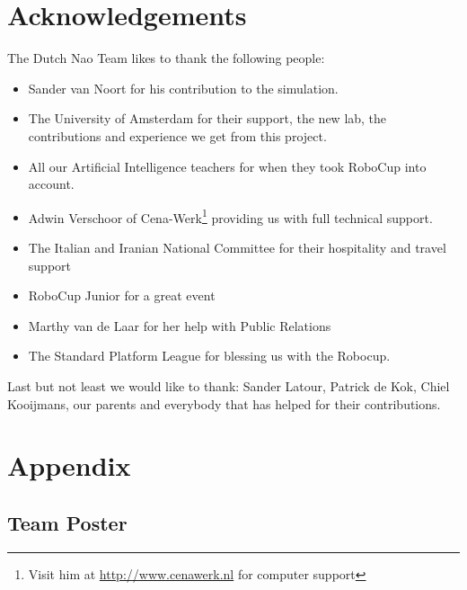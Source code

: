 \documentclass[11pt,a4paper,oneside]{article}
\begin{document}
\section{Acknowledgements}
The Dutch Nao Team likes to thank the following people:
\begin{itemize}
\item Sander van Noort for his contribution to the simulation. 
\item The University of Amsterdam for their support, the new lab, the contributions and experience we get from this project. 
\item All our Artificial Intelligence teachers for when they took RoboCup into account.
\item Adwin Verschoor of Cena-Werk\footnote{Visit him at \url{http://www.cenawerk.nl} for computer support} providing us with full technical support. 
\item The Italian and Iranian National Committee for their hospitality and travel support
\item RoboCup Junior for a great event
\item Marthy van de Laar for her help with Public Relations
\item The Standard Platform League for blessing us with the Robocup.
\end{itemize}
Last but not least we would like to thank: Sander Latour, Patrick de Kok, Chiel Kooijmans, our parents and everybody that has helped for their contributions.
\newpage



\section{Appendix}
\subsection{Team Poster}
\end{document}

